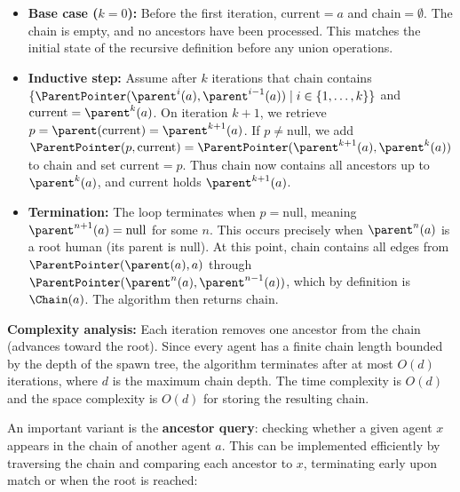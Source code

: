 \begin{itemize}
    \item \textbf{Base case ($k = 0$):} Before the first iteration, $\text{current} = a$ and $\text{chain} = \emptyset$. The chain is empty, and no ancestors have been processed. This matches the initial state of the recursive definition before any union operations.
    
    \item \textbf{Inductive step:} Assume after $k$ iterations that $\text{chain}$ contains $\{ \ParentPointer(\parent^i(a), \parent^{i-1}(a)) \mid i \in \{1, \ldots, k\} \}$ and $\text{current} = \parent^k(a)$. On iteration $k+1$, we retrieve $p = \parent(\text{current}) = \parent^{k+1}(a)$. If $p \neq \text{null}$, we add $\ParentPointer(p, \text{current}) = \ParentPointer(\parent^{k+1}(a), \parent^k(a))$ to $\text{chain}$ and set $\text{current} = p$. Thus $\text{chain}$ now contains all ancestors up to $\parent^k(a)$, and $\text{current}$ holds $\parent^{k+1}(a)$.
    
    \item \textbf{Termination:} The loop terminates when $p = \text{null}$, meaning $\parent^{n+1}(a) = \text{null}$ for some $n$. This occurs precisely when $\parent^n(a)$ is a root human (its parent is null). At this point, $\text{chain}$ contains all edges from $\ParentPointer(\parent(a), a)$ through $\ParentPointer(\parent^n(a), \parent^{n-1}(a))$, which by definition is $\Chain(a)$. The algorithm then returns $\text{chain}$.
\end{itemize}

\textbf{Complexity analysis:} Each iteration removes one ancestor from the chain (advances toward the root). Since every agent has a finite chain length bounded by the depth of the spawn tree, the algorithm terminates after at most $O(d)$ iterations, where $d$ is the maximum chain depth. The time complexity is $O(d)$ and the space complexity is $O(d)$ for storing the resulting chain.

An important variant is the \textbf{ancestor query}: checking whether a given agent $x$ appears in the chain of another agent $a$. This can be implemented efficiently by traversing the chain and comparing each ancestor to $x$, terminating early upon match or when the root is reached:

